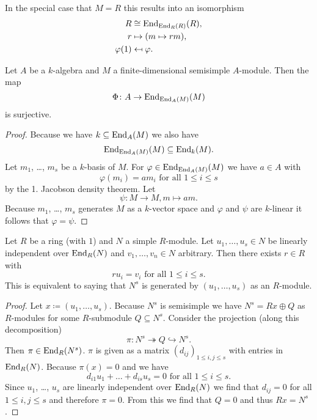 \begin{rem}
  In the special case that $M = R$ this results into an isomorphism
  \begin{align*}
    R          &\cong \operatorname{End}_{\operatorname{End}_R(R)}(R), \\
    r          &\mapsto (m \mapsto rm), \\
    \varphi(1) &\mapsfrom \varphi.
  \end{align*}
\end{rem}


\begin{cor}
  Let $A$ be a $k$-algebra and $M$ a finite-dimensional semisimple $A$-module. Then the map
  \[
    \Phi \colon A \to \operatorname{End}_{\operatorname{End}_A(M)}(M)
  \]
  is surjective.
\end{cor}
\begin{proof}
  Because we have $k \subseteq \operatorname{End}_A(M)$ we also have
  \[
    \operatorname{End}_{\operatorname{End}_A(M)}(M) \subseteq \operatorname{End}_k(M).
  \]
  Let $m_1$, \dots, $m_s$ be a $k$-basis of $M$. For $\varphi \in \operatorname{End}_{\operatorname{End}_A(M)}(M)$ we have $a \in A$ with
  \[
    \varphi(m_i) = a m_i \text{ for all } 1 \leq i \leq s
  \]
  by the 1. Jacobson density theorem. Let
  \[
    \psi \colon M \to M, m \mapsto am.
  \]
  Because $m_1$, \dots, $m_s$ generates $M$ as a $k$-vector space and $\varphi$ and $\psi$ are $k$-linear it follows that $\varphi = \psi$.
\end{proof}


\begin{thrm}
  Let $R$ be a ring (with $1$) and $N$ a simple $R$-module. Let $u_1, \dotsc, u_s \in N$ be linearly independent over $\operatorname{End}_R(N)$ and $v_1, \dotsc, v_n \in N$ arbitrary. Then there exists $r \in R$ with
  \[
    r u_i = v_i \text{ for all } 1 \leq i \leq s.
  \]
  This is equivalent to saying that $N^s$ is generated by $(u_1, \dotsc, u_s)$ as an $R$-module.
\end{thrm}


\begin{proof}
  Let $x \coloneqq (u_1, \dotsc, u_s)$. Because $N^s$ is semisimple we have $N^s = Rx \oplus Q$ as $R$-modules for some $R$-submodule $Q \subseteq N^s$. Consider the projection (along this decomposition)
  \[
    \pi \colon N^s \twoheadrightarrow Q \hookrightarrow N^s.
  \]
  Then $\pi \in \operatorname{End}_R(N^s)$. $\pi$ is given as a matrix $(d_{ij})_{1 \leq i,j \leq s}$ with entries in $\operatorname{End}_R(N)$. Because $\pi(x) = 0$ and we have
  \[
    d_{i1} u_1 + \dotsc + d_{is} u_s = 0 \text{ for all } 1 \leq i \leq s.
  \]
  Since $u_1$, \dots, $u_s$ are linearly independent over $\operatorname{End}_R(N)$ we find that $d_{ij} = 0$ for all $1 \leq i,j \leq s$ and therefore $\pi = 0$. From this we find that $Q = 0$ and thus $Rx = N^s$.
\end{proof}


